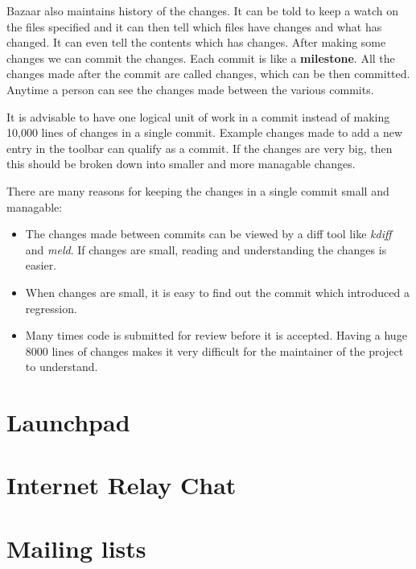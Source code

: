 Bazaar also maintains history of the changes. It can be told to keep a watch on the 
files specified and it can then tell which files have changes and what has changed. It 
can even tell the contents which has changes. After making some changes we can commit the 
changes. Each commit is like a \textbf{milestone}. All the changes made after the commit are 
called changes, which can be then committed. Anytime a person can see the changes 
made between the various commits. 

It is advisable to have one logical unit of work in a commit instead of making 10,000 
lines of changes in a single commit. Example changes made to add a new entry in the toolbar 
can qualify as a commit. If the changes are very big, then this should be broken down into 
smaller and more managable changes. 

There are many reasons for keeping the changes in a single commit small and managable: 

\begin{itemize}
\item The changes made between commits can be viewed by a diff tool like \textit{kdiff} and \textit{meld}. 
If changes are small, reading and understanding the changes is easier.
\item When changes are small, it is easy to find out the commit which introduced a regression.
\item Many times code is submitted for review before it is accepted. Having a huge 8000 lines 
of changes makes it very difficult for the maintainer of the project to understand.
\end{itemize}

\section{Launchpad}
\section{Internet Relay Chat}
\section{Mailing lists}
